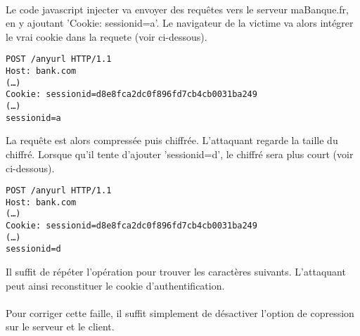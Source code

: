 \paragraph{}
Le code javascript injecter va envoyer des requêtes vers le serveur maBanque.fr, en y ajoutant 'Cookie: sessionid=a'. Le navigateur de la victime va alors intégrer le vrai cookie dans la requete (voir ci-dessous).


\begin{verbatim}
POST /anyurl HTTP/1.1
Host: bank.com
(…)
Cookie: sessionid=d8e8fca2dc0f896fd7cb4cb0031ba249
(…)
sessionid=a
\end{verbatim}


La requête est alors compressée puis chiffrée. L'attaquant regarde la taille du chiffré.
Lorsque qu'il tente d'ajouter 'sessionid=d', le chiffré sera plus court (voir ci-dessous). 


\begin{verbatim}
POST /anyurl HTTP/1.1
Host: bank.com
(…)
Cookie: sessionid=d8e8fca2dc0f896fd7cb4cb0031ba249
(…)
sessionid=d
\end{verbatim}

Il suffit de répéter l'opération pour trouver les caractères suivants. L'attaquant peut ainsi reconstituer le cookie d'authentification.

\paragraph{}
Pour corriger cette faille, il suffit simplement de désactiver l'option de copression sur le serveur et le client.
